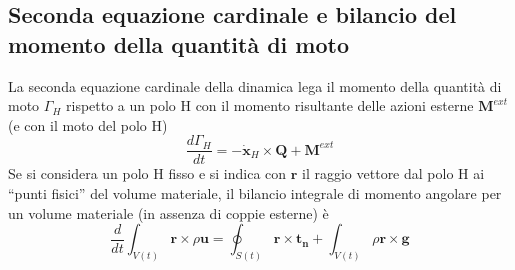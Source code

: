 \subsection{Seconda equazione cardinale e bilancio del momento della quantità di moto}
La seconda equazione cardinale della dinamica lega il momento della quantità di moto ${\Gamma}_H$ rispetto a un polo H con il momento risultante
 delle azioni esterne $\bm{M}^{ext}$ (e con il moto del polo H)
\begin{equation}
 \dfrac{d {\Gamma}_H}{dt} = -\dot{\bm{x}}_H \times \bm{Q} + \bm{M}^{ext}
\end{equation}
Se si considera un polo H fisso e si indica con $\bm{r}$ il raggio vettore dal polo H ai ``punti fisici'' del volume materiale,
 il bilancio integrale di momento angolare per un volume materiale (in assenza di coppie esterne) è
\begin{equation}
 \dfrac{d}{d t} \int_{V(t)} \bm{r} \times \rho \bm{u} = \oint_{S(t)} \bm{r} \times \bm{t_n} + \int_{V(t)} \rho \bm{r} \times \bm{g}
\end{equation}

